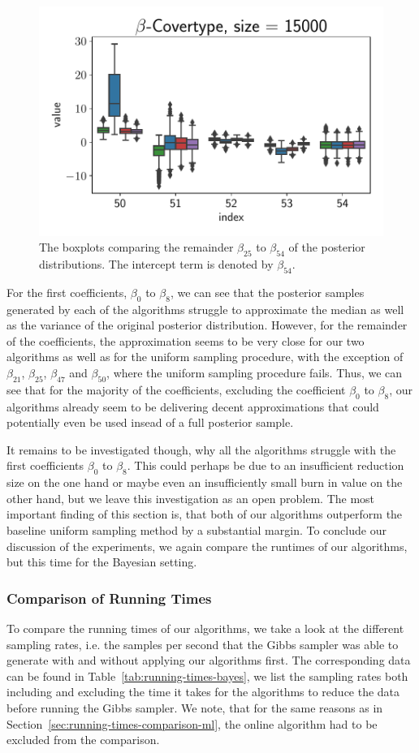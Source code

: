 \begin{figure}[ht!]
    \includegraphics[width=.49\linewidth]{figures/covertype_coefficients/covertype_coefficients_50.pdf}
    \caption{The boxplots comparing the remainder $\beta_{25}$
        to $\beta_{54}$ of the posterior distributions.
        The intercept term is denoted by $\beta_{54}$.}
    \label{fig:covertype-coefficients-2}
\end{figure}

For the first coefficients, $\beta_0$ to $\beta_{8}$, we
can see that the posterior samples generated by
each of the algorithms struggle to approximate the median
as well as the variance of the original posterior distribution.
However, for the remainder of the coefficients, the approximation
seems to be very close for our two algorithms as well as for
the uniform sampling procedure, with the exception of
$\beta_{21}$, $\beta_{25}$, $\beta_{47}$ and $\beta_{50}$,
where the uniform sampling procedure fails.
Thus, we can see that for the majority of the coefficients, excluding
the coefficient $\beta_0$ to $\beta_{8}$, our algorithms already
seem to be delivering decent approximations that could potentially
even be used insead of a full posterior sample.

It remains to be investigated though, why all the algorithms struggle
with the first coefficients $\beta_0$ to $\beta_8$.
This could perhaps be due to an insufficient reduction size on
the one hand or maybe even an insufficiently small burn in value
on the other hand, but we leave this investigation as an open
problem. The most important finding of this section is, that both
of our algorithms outperform the baseline uniform sampling method
by a substantial margin.
To conclude our discussion of the experiments, we again compare
the runtimes of our algorithms, but this time for the
Bayesian setting.

\subsubsection{Comparison of Running Times}

To compare the running times of our algorithms, we take a
look at the different sampling rates, i.e.
the samples per second that the Gibbs sampler
was able to generate with and without applying our
algorithms first. The corresponding data can be found in
Table~\ref{tab:running-times-bayes}, we list the
sampling rates both including and excluding the
time it takes for the algorithms to reduce the data
before running the Gibbs sampler. We note, that for the
same reasons as in Section~\ref{sec:running-times-comparison-ml},
the online algorithm had to be excluded from the comparison.

